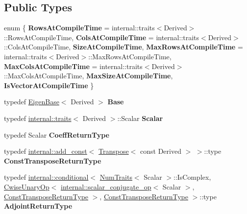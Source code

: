 \subsection*{Public Types}
\begin{DoxyCompactItemize}
\item 
\mbox{\label{class_eigen_1_1_solver_base_adc7f64b62cca876e334028ae89a4e15d}} 
enum \{ \newline
{\bfseries Rows\+At\+Compile\+Time} = internal\+::traits$<$Derived$>$\+::Rows\+At\+Compile\+Time, 
{\bfseries Cols\+At\+Compile\+Time} = internal\+::traits$<$Derived$>$\+::Cols\+At\+Compile\+Time, 
{\bfseries Size\+At\+Compile\+Time}, 
{\bfseries Max\+Rows\+At\+Compile\+Time} = internal\+::traits$<$Derived$>$\+::Max\+Rows\+At\+Compile\+Time, 
\newline
{\bfseries Max\+Cols\+At\+Compile\+Time} = internal\+::traits$<$Derived$>$\+::Max\+Cols\+At\+Compile\+Time, 
{\bfseries Max\+Size\+At\+Compile\+Time}, 
{\bfseries Is\+Vector\+At\+Compile\+Time}
 \}
\item 
\mbox{\label{class_eigen_1_1_solver_base_a12798f4bbad57ef378b087801ab90cfe}} 
typedef \mbox{\hyperlink{struct_eigen_1_1_eigen_base}{Eigen\+Base}}$<$ Derived $>$ {\bfseries Base}
\item 
\mbox{\label{class_eigen_1_1_solver_base_a08184e3c085cce33f80b5a37376d52ab}} 
typedef \mbox{\hyperlink{struct_eigen_1_1internal_1_1traits}{internal\+::traits}}$<$ Derived $>$\+::Scalar {\bfseries Scalar}
\item 
\mbox{\label{class_eigen_1_1_solver_base_a8013b6454a87289d3e1cd138615af3d3}} 
typedef Scalar {\bfseries Coeff\+Return\+Type}
\item 
\mbox{\label{class_eigen_1_1_solver_base_ab99f15ef1fa6885e393ea809ca402946}} 
typedef \mbox{\hyperlink{struct_eigen_1_1internal_1_1add__const}{internal\+::add\+\_\+const}}$<$ \mbox{\hyperlink{class_eigen_1_1_transpose}{Transpose}}$<$ const Derived $>$ $>$\+::type {\bfseries Const\+Transpose\+Return\+Type}
\item 
\mbox{\label{class_eigen_1_1_solver_base_a8fd44c45359c0102af1a47752c2b8c82}} 
typedef \mbox{\hyperlink{struct_eigen_1_1internal_1_1conditional}{internal\+::conditional}}$<$ \mbox{\hyperlink{struct_eigen_1_1_num_traits}{Num\+Traits}}$<$ Scalar $>$\+::Is\+Complex, \mbox{\hyperlink{class_eigen_1_1_cwise_unary_op}{Cwise\+Unary\+Op}}$<$ \mbox{\hyperlink{struct_eigen_1_1internal_1_1scalar__conjugate__op}{internal\+::scalar\+\_\+conjugate\+\_\+op}}$<$ Scalar $>$, \mbox{\hyperlink{class_eigen_1_1_transpose}{Const\+Transpose\+Return\+Type}} $>$, \mbox{\hyperlink{class_eigen_1_1_transpose}{Const\+Transpose\+Return\+Type}} $>$\+::type {\bfseries Adjoint\+Return\+Type}
\end{DoxyCompactItemize}

